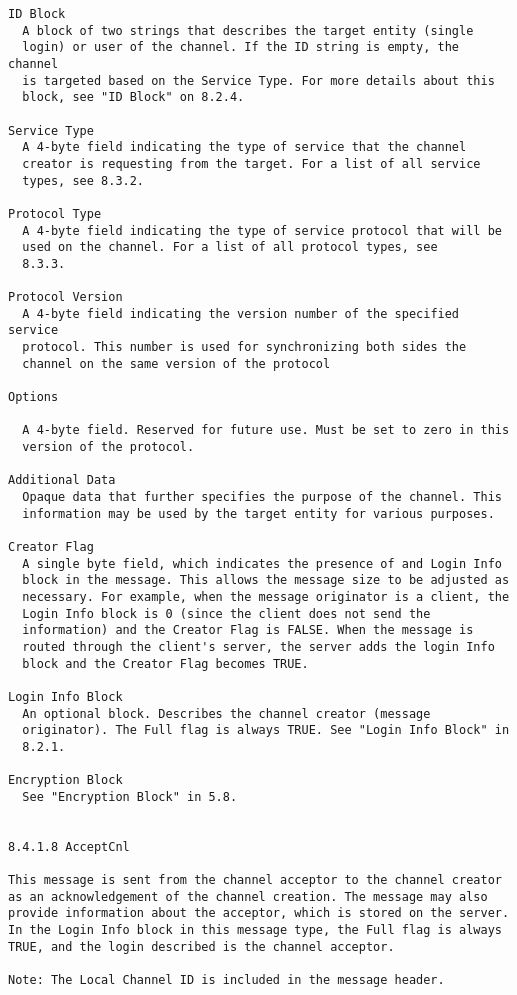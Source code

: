 \documentclass[titlepage,oneside]{book}
\begin{document}
\begin{verbatim}
ID Block
  A block of two strings that describes the target entity (single
  login) or user of the channel. If the ID string is empty, the channel
  is targeted based on the Service Type. For more details about this
  block, see "ID Block" on 8.2.4.

Service Type
  A 4-byte field indicating the type of service that the channel
  creator is requesting from the target. For a list of all service
  types, see 8.3.2.

Protocol Type
  A 4-byte field indicating the type of service protocol that will be 
  used on the channel. For a list of all protocol types, see 
  8.3.3.

Protocol Version
  A 4-byte field indicating the version number of the specified service
  protocol. This number is used for synchronizing both sides the
  channel on the same version of the protocol

Options

  A 4-byte field. Reserved for future use. Must be set to zero in this
  version of the protocol.

Additional Data
  Opaque data that further specifies the purpose of the channel. This
  information may be used by the target entity for various purposes.

Creator Flag
  A single byte field, which indicates the presence of and Login Info
  block in the message. This allows the message size to be adjusted as
  necessary. For example, when the message originator is a client, the
  Login Info block is 0 (since the client does not send the
  information) and the Creator Flag is FALSE. When the message is
  routed through the client's server, the server adds the login Info
  block and the Creator Flag becomes TRUE.

Login Info Block
  An optional block. Describes the channel creator (message
  originator). The Full flag is always TRUE. See "Login Info Block" in
  8.2.1.

Encryption Block
  See "Encryption Block" in 5.8.


8.4.1.8 AcceptCnl

This message is sent from the channel acceptor to the channel creator
as an acknowledgement of the channel creation. The message may also
provide information about the acceptor, which is stored on the server.
In the Login Info block in this message type, the Full flag is always
TRUE, and the login described is the channel acceptor.

Note: The Local Channel ID is included in the message header.


\end{verbatim}
\end{document}
